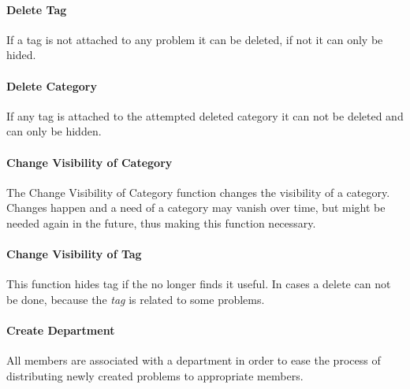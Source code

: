 \paragraph{Delete Tag} If a tag is not attached to any problem it can be deleted, if not it can only be hided. 

\paragraph{Delete Category} If any tag is attached to the attempted deleted category it can not be deleted and can only be hidden. 

\paragraph{Change Visibility of Category} The Change Visibility of Category function changes the visibility of a category. Changes happen and a need of a category may vanish over time, but might be needed again in the future, thus making this function necessary. 

\paragraph{Change Visibility of Tag} This function hides tag if the \sadmin{} no longer finds it useful. In cases a delete can not be done, because the \textit{tag} is related to some problems. 




\paragraph{Create Department} All \astaff[] members are associated with a department in order to ease the process of distributing newly created problems to appropriate \astaff[] members. 

